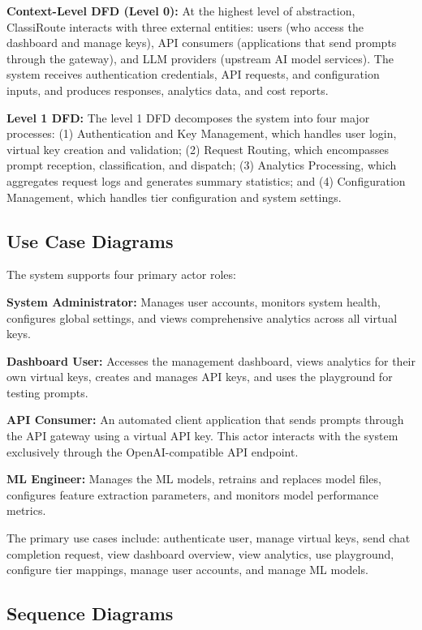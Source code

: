 \documentclass[oneside,12pt,a4paper]{report}
\begin{document}
\textbf{Context-Level DFD (Level 0):} At the highest level of abstraction, ClassiRoute interacts with three external entities: users (who access the dashboard and manage keys), API consumers (applications that send prompts through the gateway), and LLM providers (upstream AI model services). The system receives authentication credentials, API requests, and configuration inputs, and produces responses, analytics data, and cost reports.

\textbf{Level 1 DFD:} The level 1 DFD decomposes the system into four major processes: (1) Authentication and Key Management, which handles user login, virtual key creation and validation; (2) Request Routing, which encompasses prompt reception, classification, and dispatch; (3) Analytics Processing, which aggregates request logs and generates summary statistics; and (4) Configuration Management, which handles tier configuration and system settings.

\subsection{Use Case Diagrams}

The system supports four primary actor roles:

\textbf{System Administrator:} Manages user accounts, monitors system health, configures global settings, and views comprehensive analytics across all virtual keys.

\textbf{Dashboard User:} Accesses the management dashboard, views analytics for their own virtual keys, creates and manages API keys, and uses the playground for testing prompts.

\textbf{API Consumer:} An automated client application that sends prompts through the API gateway using a virtual API key. This actor interacts with the system exclusively through the OpenAI-compatible API endpoint.

\textbf{ML Engineer:} Manages the ML models, retrains and replaces model files, configures feature extraction parameters, and monitors model performance metrics.

The primary use cases include: authenticate user, manage virtual keys, send chat completion request, view dashboard overview, view analytics, use playground, configure tier mappings, manage user accounts, and manage ML models.

\subsection{Sequence Diagrams}
\end{document}
